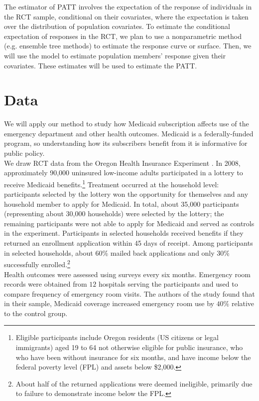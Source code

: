 \documentclass{article}
\begin{document}
The estimator of PATT involves the expectation of the response of individuals in the RCT sample, conditional on their covariates, where the expectation is taken over the distribution of population covariates.  To estimate the conditional expectation of responses in the RCT, we plan to use a nonparametric method (e.g. ensemble tree methods) to estimate the response curve or surface.  Then, we will use the model to estimate population members' response given their covariates.  These estimates will be used to estimate the PATT.

\section{Data}
We will apply our method to study how Medicaid subscription affects use of the emergency department and other health outcomes.  Medicaid is a federally-funded program, so understanding how its subscribers benefit from it is informative for public policy. \\

We draw RCT data from the Oregon Health Insurance Experiment \cite{finkelstein2012,Taubman}.  In 2008, approximately 90,000 uninsured low-income adults participated in a lottery to receive Medicaid benefits.\footnote{Eligible participants include Oregon residents (US citizens or legal immigrants) aged 19 to 64 not otherwise eligible for public insurance, who who have been without insurance for six months, and have income below the federal poverty level (FPL) and assets below \$2,000.} Treatment occurred at the household level: participants selected by the lottery won the opportunity for themselves and any household member to apply for Medicaid. In total, about 35,000 participants (representing about 30,000 households) were selected by the lottery; the remaining participants were not able to apply for Medicaid and served as controls in the experiment.  Participants in selected households received benefits if they returned an enrollment application within 45 days of receipt. Among  participants in selected households, about 60\% mailed back applications and only 30\% successfully enrolled.\footnote{About half of the returned applications were deemed ineligible, primarily due to failure to demonstrate income below the FPL.} \\

Health outcomes were assessed using surveys every six months.  Emergency room records were obtained from $12$ hospitals serving the participants and used to compare frequency of emergency room visits.  The authors of the study found that in their sample, Medicaid coverage increased emergency room use by $40\%$ relative to the control group. \\
\end{document}
